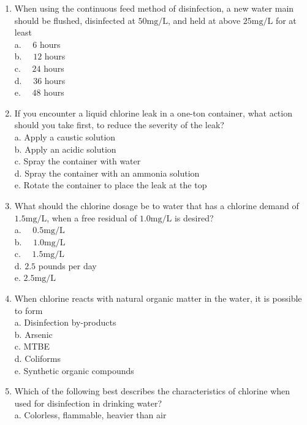 \documentclass{article}
\begin{document}
\begin{enumerate}
\item When using the continuous feed method of disinfection, a new water main should be flushed, disinfected at $50 \mathrm{mg} / \mathrm{L}$, and held at above $25 \mathrm{mg} / \mathrm{L}$ for at least\\
a. $\quad 6$ hours\\
b. $\quad 12$ hours\\
c. $\quad 24$ hours\\
d. $\quad 36$ hours\\
e. $\quad 48$ hours\\
  \item If you encounter a liquid chlorine leak in a one-ton container, what action should you take first, to reduce the severity of the leak?\\
a. Apply a caustic solution\\
b. Apply an acidic solution\\
c. Spray the container with water\\
d. Spray the container with an ammonia solution\\
e. Rotate the container to place the leak at the top\\
  \item What should the chlorine dosage be to water that has a chlorine demand of $1.5 \mathrm{mg} / \mathrm{L}$, when a free residual of $1.0 \mathrm{mg} / \mathrm{L}$ is desired?\\
a. $\quad 0.5 \mathrm{mg} / \mathrm{L}$\\
b. $\quad 1.0 \mathrm{mg} / \mathrm{L}$\\
c. $\quad 1.5 \mathrm{mg} / \mathrm{L}$\\
d. $2.5$ pounds per day\\
e. $2.5 \mathrm{mg} / \mathrm{L}$\\
  \item When chlorine reacts with natural organic matter in the water, it is possible to form\\
a. Disinfection by-products \\
b. Arsenic \\
c. MTBE \\
d. Coliforms\\
e. Synthetic organic compounds\\
\item Which of the following best describes the characteristics of chlorine when used for disinfection in drinking water?\\
a.	 Colorless, flammable, heavier than air\\

\end{enumerate}
\end{document}
